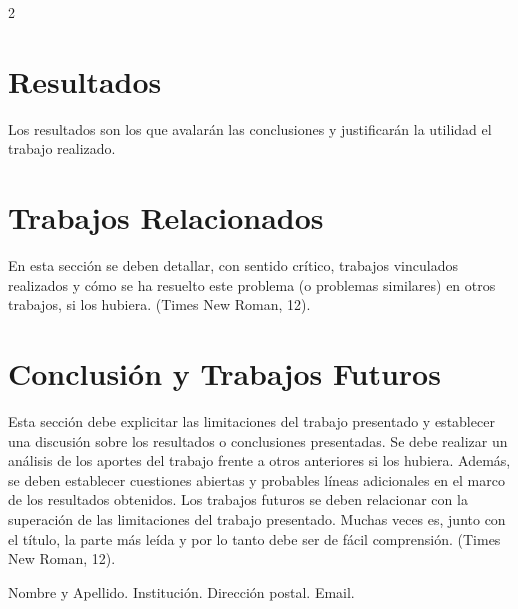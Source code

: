 \begin{multicols}{2}
\section{Resultados}

Los resultados son los que avalarán las conclusiones y justificarán la utilidad el trabajo realizado.

\section{Trabajos Relacionados}

En esta sección se deben detallar, con sentido crítico, trabajos vinculados realizados y cómo se ha resuelto este problema (o problemas similares) en otros trabajos, si los hubiera. (Times New Roman, 12).

\section{Conclusión y Trabajos Futuros}

Esta sección debe explicitar las \cite{malik_improved_2023} limitaciones del trabajo presentado y establecer una discusión sobre los resultados o conclusiones presentadas. Se debe realizar un análisis de los aportes del trabajo frente a otros anteriores si los hubiera. Además, se deben establecer cuestiones abiertas y probables líneas adicionales en el marco de los resultados obtenidos. Los trabajos futuros se deben relacionar con la superación de las limitaciones del trabajo presentado. Muchas veces es, junto con el título, la parte más leída y por lo tanto debe ser de fácil comprensión. (Times New Roman, 12).


\renewcommand\refname{Referencias}






%


{\it\footnotesize

Nombre y Apellido. Institución. Dirección postal. Email. 

}
\end{multicols}
